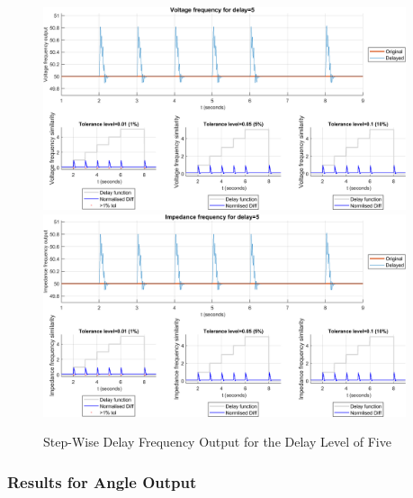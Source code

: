 \begin{figure}
    \caption{Step-Wise Delay Frequency Output for the Delay Level of Five}
    \includegraphics[width=0.95\textwidth]{PMUsim-figures/DelayOf_5/Step_vFrequency.png}    
    \label{fig:PMUsimStep_Five_vFrequency}
    \includegraphics[width=0.95\textwidth]{PMUsim-figures/DelayOf_5/Step_iFrequency.png}    
    \label{fig:PMUsimStep_Five_Frequency}
        \begin{small}
     \end{small}
\end{figure}


\newpage \subsubsection{Results for Angle Output}


